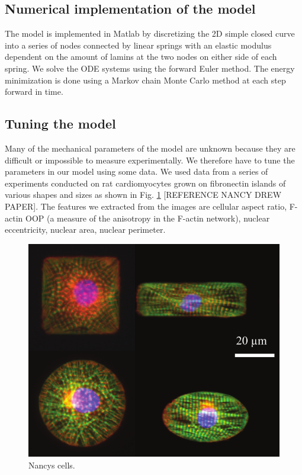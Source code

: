 \subsection{Numerical implementation of the model}

The model is implemented in Matlab by discretizing the 2D simple closed curve into a series of nodes connected by linear springs with an elastic modulus dependent on the amount of lamins at the two nodes on either side of each spring. We solve the ODE systems using the forward Euler method. The energy minimization is done using a Markov chain Monte Carlo method at each step forward in time. 

\subsection{Tuning the model}

Many of the mechanical parameters of the model are unknown because they are difficult or impossible to measure experimentally. We therefore have to tune the parameters in our model using some data. We used data from a series of experiments conducted on rat cardiomyocytes grown on fibronectin islands of various shapes and sizes as shown in Fig. \ref{fig::nancycells} [REFERENCE NANCY DREW PAPER]. The features we extracted from the images are cellular aspect ratio, F-actin OOP (a measure of the anisotropy in the F-actin network), nuclear eccentricity, nuclear area, nuclear perimeter. 

\begin{figure}[h]
\centering
\captionsetup{width=.9\linewidth}
\includegraphics[width=4.5in]{Project3/figs/nancycells.pdf}
\caption{Nancys cells.}
\label{fig::nancycells}
\end{figure}

